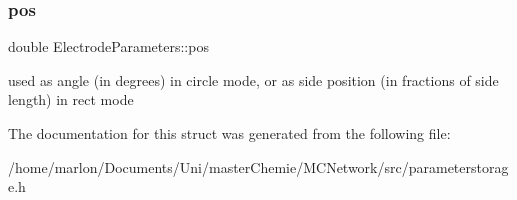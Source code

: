 \subsubsection{\texorpdfstring{pos}{pos}}
{\footnotesize\ttfamily double Electrode\+Parameters\+::pos}

used as angle (in degrees) in circle mode, or as side position (in fractions of side length) in rect mode 

The documentation for this struct was generated from the following file\+:\begin{DoxyCompactItemize}
\item 
/home/marlon/\+Documents/\+Uni/master\+Chemie/\+M\+C\+Network/src/parameterstorage.\+h\end{DoxyCompactItemize}

